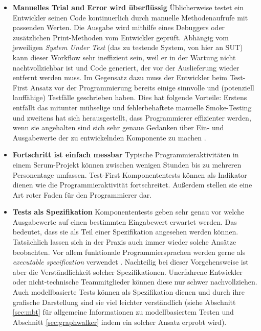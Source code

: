 \begin{itemize}
\item \textbf{Manuelles Trial and Error wird überflüssig} Üblicherweise testet ein Entwickler seinen Code kontinuerlich durch manuelle Methodenaufrufe mit passenden Werten. Die Ausgabe wird mithilfe eines Debuggers oder zusätzlichen Print-Methoden vom Entwickler geprüft. Abhängig vom jeweiligen \textit{System Under Test} (das zu testende System, von hier an \gls{SUT}) kann dieser Workflow sehr ineffizient sein, weil er in der Wartung nicht nachtvollziehbar ist und Code generiert, der vor der Auslieferung wieder entfernt werden muss. Im Gegensatz dazu muss der Entwickler beim Test-First Ansatz vor der Programmierung bereits einige sinnvolle und (potenziell lauffähige) Testfälle geschrieben haben. Dies hat folgende Vorteile: Erstens entfällt das mitunter mühselige und fehlerbehaftete manuelle \Gls{Smoke-Testing} und zweitens hat sich herausgestellt, dass Programmierer effizienter werden, wenn sie angehalten sind sich sehr genaue Gedanken über Ein- und Ausgabewerte der zu entwickelnden Komponente zu machen \cite{erdogmus_effectiveness_2005}.
\item \textbf{Fortschritt ist einfach messbar} Typische Programmieraktivitäten in einem Scrum-Projekt können zwischen wenigen Stunden bis zu mehreren Personentage umfassen. Test-First Komponententests können als Indikator dienen wie die Programmieraktivität fortschreitet. Außerdem stellen sie eine Art roter Faden für den Programmierer dar.
\item \textbf{Tests als Spezifikation} Komponententests geben sehr genau vor welche Ausgabewerte auf einen bestimmten Eingabewert erwartet werden. Das bedeutet, dass sie als Teil einer Spezifikation angesehen werden können. Tatsächlich lassen sich in der Praxis auch immer wieder solche Ansätze beobachten. Vor allem funktionale Programmiersprachen werden gerne als \textit{executable specification} verwendet \cite{klein_sel4:_2010}. Nachteilig bei dieser Vorgehensweise ist aber die Verständlichkeit solcher Spezifikationen. Unerfahrene Entwickler oder nicht-technische Teammitglieder können diese nur schwer nachvollziehen. Auch modellbasierte Tests können als Spezifikation dienen und durch ihre grafische Darstellung sind sie viel leichter verständlich (siehe Abschnitt \ref{sec:mbt} für allgemeine Informationen zu modellbasiertem Testen und Abschnitt \ref{sec:graphwalker} indem ein solcher Ansatz erprobt wird).
\end{itemize}


